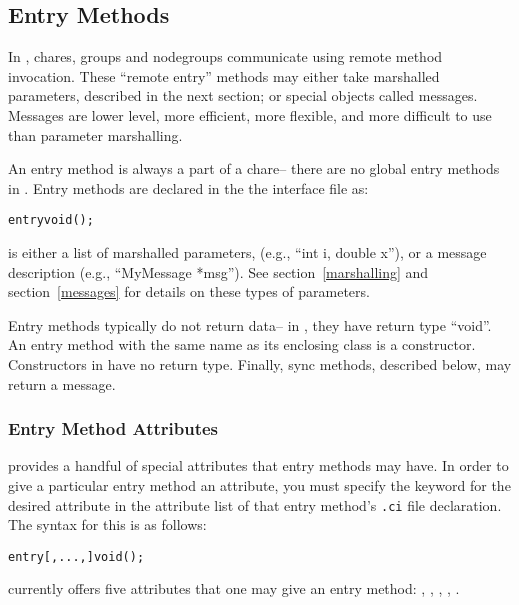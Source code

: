 \subsection{Entry Methods}
\label{entry}

In \charmpp, chares, groups and 
nodegroups communicate using remote method invocation.  These ``remote entry'' methods may either take marshalled parameters, described in the next section; or special objects called messages.  Messages are lower level, more efficient, more flexible, and more difficult to use than parameter marshalling.

An entry method is always a part of a chare--
there are no global entry methods in \charmpp{}.
Entry methods are declared in the the interface file as:

\begin{alltt}
entry void ();
\end{alltt}

 is either a list of marshalled parameters,
(e.g., ``int i, double x''), or a message description (e.g.,
``MyMessage *msg'').  See section~\ref{marshalling} and
section~\ref{messages} for details on these types of
parameters.

Entry methods typically do not return data-- in \CC, they have
return type ``void''.  An entry method with the same name
as its enclosing class is a constructor.  Constructors in \CC
have no return type.  Finally, sync methods, described below,
may return a message.

\subsubsection{Entry Method Attributes}
\label{attributes}

\charmpp{}  provides a handful of special attributes that entry methods may have.  In order to give a particular entry method an attribute, you must specify the keyword for the desired
attribute in the attribute list of that entry method's {\tt .ci} file
declaration.  The syntax for this is as follows:

\begin{alltt}
entry [, ..., ] void ();
\end{alltt}

\charmpp{} currently offers five attributes that one may give an entry method:
, , , , .

